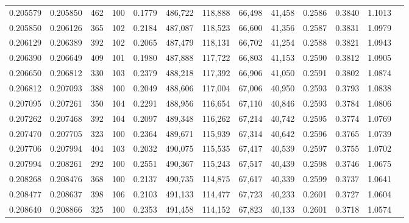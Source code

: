 \begin{tabular}{rrrrrrrrrrrrr}
0.205579 & 0.205850 &   462 & 100 &                                     0.1779 & 486,722 & 118,888 &  66,498 &  41,458 & 0.2586 & 0.3840 & 1.1013 \\
0.205850 & 0.206126 &   365 & 102 &                                     0.2184 & 487,087 & 118,523 &  66,600 &  41,356 & 0.2587 & 0.3831 & 1.0979 \\
0.206129 & 0.206389 &   392 & 102 &                                     0.2065 & 487,479 & 118,131 &  66,702 &  41,254 & 0.2588 & 0.3821 & 1.0943 \\
0.206390 & 0.206649 &   409 & 101 &                                     0.1980 & 487,888 & 117,722 &  66,803 &  41,153 & 0.2590 & 0.3812 & 1.0905 \\
0.206650 & 0.206812 &   330 & 103 &                                     0.2379 & 488,218 & 117,392 &  66,906 &  41,050 & 0.2591 & 0.3802 & 1.0874 \\
0.206812 & 0.207093 &   388 & 100 &                                     0.2049 & 488,606 & 117,004 &  67,006 &  40,950 & 0.2593 & 0.3793 & 1.0838 \\
0.207095 & 0.207261 &   350 & 104 &                                     0.2291 & 488,956 & 116,654 &  67,110 &  40,846 & 0.2593 & 0.3784 & 1.0806 \\
0.207262 & 0.207468 &   392 & 104 &                                     0.2097 & 489,348 & 116,262 &  67,214 &  40,742 & 0.2595 & 0.3774 & 1.0769 \\
0.207470 & 0.207705 &   323 & 100 &                                     0.2364 & 489,671 & 115,939 &  67,314 &  40,642 & 0.2596 & 0.3765 & 1.0739 \\
0.207706 & 0.207994 &   404 & 103 &                                     0.2032 & 490,075 & 115,535 &  67,417 &  40,539 & 0.2597 & 0.3755 & 1.0702 \\
0.207994 & 0.208261 &   292 & 100 &                                     0.2551 & 490,367 & 115,243 &  67,517 &  40,439 & 0.2598 & 0.3746 & 1.0675 \\
0.208268 & 0.208476 &   368 & 100 &                                     0.2137 & 490,735 & 114,875 &  67,617 &  40,339 & 0.2599 & 0.3737 & 1.0641 \\
0.208477 & 0.208637 &   398 & 106 &                                     0.2103 & 491,133 & 114,477 &  67,723 &  40,233 & 0.2601 & 0.3727 & 1.0604 \\
0.208640 & 0.208866 &   325 & 100 &                                     0.2353 & 491,458 & 114,152 &  67,823 &  40,133 & 0.2601 & 0.3718 & 1.0574 \\

\end{tabular}
